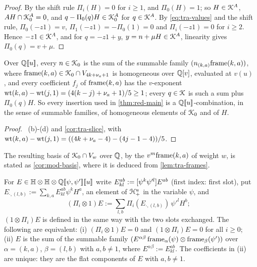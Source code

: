 \begin{proof}
By the shift rule $\Pi_i(H) = 0$ for $i\geq 1$, and $\Pi_0(H) = 1$; so $H\in\mathcal{K}^A$, $AH\cap\mathcal{K}_{0}^A = 0$, and $q-\Pi_0(q)H\in\mathcal{K}_{0}^A$ for $q\in\mathcal{K}^A$. By \eqref{eq:tra-values} and the shift rule, $\Pi_0(-z1) = v$, $\Pi_1(-z1) = -\Pi_0(1) = 0$ and $\Pi_i(-z1) = 0$ for $i\geq 2$. Hence $-z1\in\mathcal{K}^A$, and for $q = -z1+y$, $y = n+\mu H\in\mathcal{K}^A$, linearity gives $\Pi_0(q) = v+\mu$.
\end{proof}

\begin{lem}
\label{lem:tra-coeff}
Over $\mathbb{Q}[\![ u ]\!]$, every $n\in\mathcal{K}_{0}$ is the sum of the summable family $(n_{(k,a)}\mathrm{frame}(k,a))$, where $\mathrm{frame}(k,a)\in\mathcal{K}_{0}\cap V_{4k+\nu_a+1}$ is homogeneous over $\mathbb{Q}[v]$, evaluated at $v(u)$, and every coefficient $f_j$ of $\mathrm{frame}(k,a)$ has the $v$-exponent $\operatorname{wt}(k,a)-\operatorname{wt}(j,1) = (4(k-j)+\nu_a+1)/5\geq 1$; every $q\in\mathcal{K}$ is such a sum plus $\Pi_0(q)H$. So every insertion used in \cref{thm:red-main} is a $\mathbb{Q}[\![ u ]\!]$-combination, in the sense of summable families, of homogeneous elements of $\mathcal{K}_{0}$ and of $H$.
\end{lem}

\begin{proof}
~(b)-(d) and \cref{cor:tra-slice}, with $\operatorname{wt}(k,a)-\operatorname{wt}(j,1) = ((4k+\nu_a-4)-(4j-1-4))/5$.
\end{proof}

The resulting basis of $\mathcal{K}_{0}\cap V_w$ over $\mathbb{Q}$, by the $v^m\mathrm{frame}(k,a)$ of weight $w$, is stated as \cref{cor:mod-basis}, where it is deduced from \cref{lem:tra-frames}.

\begin{lem}
\label{lem:tra-twoslot}
For $E\in\mathbb{H}\otimes\mathbb{H}\otimes\mathbb{Q}[\![ \psi,\psi' ]\!][\![ u ]\!]$ write $E^{ab}_{kl} := [\psi^k\psi'^l]E^{ab}$ (first index: first slot), put $E_{\cdot,(l,b)} := \sum_{k,a}E^{ab}_{kl}\psi^kH^a$, an element of $\mathcal{H}^u_+$ in the variable $\psi$, and
\[
(\Pi_i\otimes 1)E := \sum_{l,b}\Pi_i(E_{\cdot,(l,b)})\,\psi'^lH^b ;
\]
$(1\otimes\Pi_i)E$ is defined in the same way with the two slots exchanged. The following are equivalent: (i) $(\Pi_i\otimes 1)E = 0$ and $(1\otimes\Pi_i)E = 0$ for all $i\geq 0$; (ii) $E$ is the sum of the summable family $(E^{\alpha\beta}\,\mathrm{frame}_\alpha(\psi)\otimes\mathrm{frame}_\beta(\psi'))$ over $\alpha = (k,a)$, $\beta = (l,b)$ with $a,b\neq 1$, where $E^{\alpha\beta} := E^{ab}_{kl}$. The coefficients in (ii) are unique: they are the flat components of $E$ with $a,b\neq 1$.
\end{lem}

